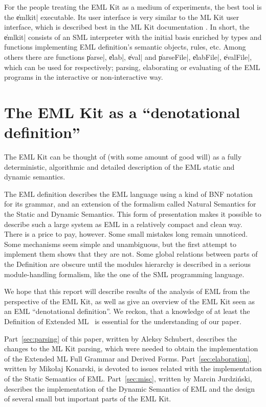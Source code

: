 For the people treating the EML Kit as a medium of experiments, 
the best tool is the \|emlkit| executable.
Its user interface is very similar to the ML Kit user interface, 
which is described best in the ML Kit documentation \cite{BRTT93}.
In short, the \|emlkit| consists of an SML interpreter with the
initial basis enriched by types and functions implementing
EML definition's semantic objects, rules, etc.
Among others there are functions \|parse|, \|elab|, \|eval|
and \|parseFile|, \|elabFile|, \|evalFile|, which can be used
for respectively; parsing, elaborating or evaluating of the EML programs
in the interactive or non-interactive way.

\section{The EML Kit as a ``denotational definition''}
\label{sec:denotational}

The EML Kit can be thought of (with some amount of good will)
as a fully deterministic, algorithmic and detailed
description of the EML static and dynamic semantics.

The EML definition describes the EML language using
a kind of BNF notation for its grammar, and an extension
of the formalism called Natural Semantics for the Static and Dynamic Semantics.
This form of presentation makes it possible to
describe such a large system as EML in a relatively compact
and clean way. There is a price to pay, however.
Some small mistakes long remain unnoticed.
Some mechanisms seem simple and unambiguous, 
but the first attempt to implement them
shows that they are not.
Some global relations between parts of the Definition 
are obscure until the modules hierarchy
is described in a serious module-handling formalism, like the 
one of the SML programming language.

We hope that this report will describe results
of the analysis of EML from the perspective
of the EML Kit, as well as give an overview of the EML Kit seen 
as an EML ``denotational definition''. We reckon, that  
a knowledge of at least the Definition of Extended ML~\cite{bib:KST94} 
is essential for the understanding of our paper.

Part~\ref{sec:parsing} of this paper, written by Aleksy Schubert,
describes the changes to the ML Kit parsing,  
which were needed to obtain the implementation of 
the Extended ML Full Grammar and Derived Forms.
Part~\ref{sec:elaboration}, written by Miko{\l}aj
Konarski, is devoted to issues related with 
the implementation of the Static Semantics of EML.
Part~\ref{sec:misc}, written by Marcin Jurdzi\'nski,
describes the implementation of the Dynamic Semantics of EML
and the design of several small but important parts of the EML Kit.   
